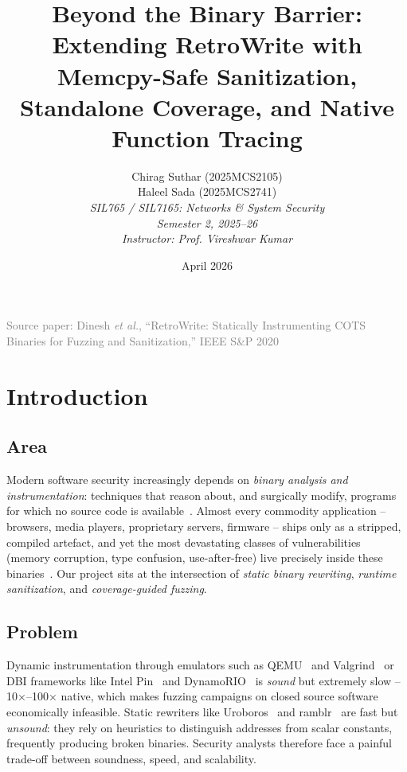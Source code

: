 \documentclass[10pt,a4paper]{article}
\title{\textbf{Beyond the Binary Barrier:\\Extending RetroWrite with Memcpy-Safe Sanitization, Standalone Coverage, and Native Function Tracing}}
\author{
    Chirag Suthar (2025MCS2105) \\
    Haleel Sada (2025MCS2741) \\[6pt]
    \textit{SIL765 / SIL7165: Networks \& System Security} \\
    \textit{Semester 2, 2025--26} \\
    \textit{Instructor: Prof. Vireshwar Kumar}
}
\date{April 2026}
\begin{document}
\maketitle
\thispagestyle{fancy}
\vspace{-1em}
\begin{center}
\footnotesize
\textcolor{gray}{Source paper: Dinesh \emph{et al.}, ``RetroWrite: Statically Instrumenting COTS Binaries for Fuzzing and Sanitization,'' IEEE S\&P 2020 \cite{retrowrite}}
\end{center}
\newpage

\section{Introduction}

\subsection{Area}
Modern software security increasingly depends on \emph{binary analysis and
instrumentation}: techniques that reason about, and surgically modify, programs
for which no source code is available~\cite{retrowrite,dyninst,pin}. Almost
every commodity application -- browsers, media players, proprietary servers,
firmware -- ships only as a stripped, compiled artefact, and yet the most
devastating classes of vulnerabilities (memory corruption, type confusion,
use-after-free) live precisely inside these binaries~\cite{asan,szekeres}. Our
project sits at the intersection of \emph{static binary rewriting},
\emph{runtime sanitization}, and \emph{coverage-guided fuzzing}.

\subsection{Problem}
Dynamic instrumentation through emulators such as QEMU~\cite{qemu} and
Valgrind~\cite{valgrind} or DBI frameworks like Intel Pin~\cite{pin} and
DynamoRIO~\cite{dynamorio} is \emph{sound} but extremely slow --
\mbox{10$\times$}--100$\times$ native, which makes fuzzing campaigns on closed
source software economically infeasible. Static rewriters like
Uroboros~\cite{uroboros} and ramblr~\cite{ramblr} are fast but
\emph{unsound}: they rely on heuristics to distinguish addresses from scalar
constants, frequently producing broken binaries. Security analysts therefore
face a painful trade-off between soundness, speed, and scalability.
\end{document}
